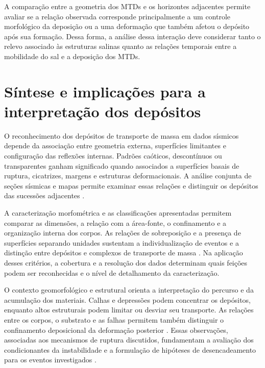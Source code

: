 A comparação entre a geometria dos MTDs e os horizontes adjacentes permite avaliar se a relação observada corresponde principalmente a um controle morfológico da deposição ou a uma deformação que também afetou o depósito após sua formação. Dessa forma, a análise dessa interação deve considerar tanto o relevo associado às estruturas salinas quanto as relações temporais entre a mobilidade do sal e a deposição dos MTDs.

\section{Síntese e implicações para a interpretação dos depósitos}\label{sec:2-4}

O reconhecimento dos depósitos de transporte de massa em dados sísmicos depende da associação entre geometria externa, superfícies limitantes e configuração das reflexões internas. Padrões caóticos, descontínuos ou transparentes ganham significado quando associados a superfícies basais de ruptura, cicatrizes, margens e estruturas deformacionais. A análise conjunta de seções sísmicas e mapas permite examinar essas relações e distinguir os depósitos das sucessões adjacentes \cite{hampton1996,posamentier2011,scarselli2020}.

A caracterização morfométrica e as classificações apresentadas permitem comparar as dimensões, a relação com a área-fonte, o confinamento e a organização interna dos corpos. As relações de sobreposição e a presença de superfícies separando unidades sustentam a individualização de eventos e a distinção entre depósitos e complexos de transporte de massa \cite{ortizkarpf2016,clare2018}. Na aplicação desses critérios, a cobertura e a resolução dos dados determinam quais feições podem ser reconhecidas e o nível de detalhamento da caracterização.

O contexto geomorfológico e estrutural orienta a interpretação do percurso e da acumulação dos materiais. Calhas e depressões podem concentrar os depósitos, enquanto altos estruturais podem limitar ou desviar seu transporte. As relações entre os corpos, o substrato e as falhas permitem também distinguir o confinamento deposicional da deformação posterior \cite{moscardelli2008,gamboa2016}. Essas observações, associadas aos mecanismos de ruptura discutidos, fundamentam a avaliação dos condicionantes da instabilidade e a formulação de hipóteses de desencadeamento para os eventos investigados \cite{lee2007,scarselli2020}.
